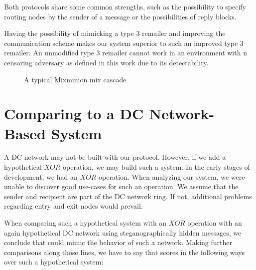 Both protocols share some common strengths, such as the possibility to specify routing nodes by the sender of a message or the possibilities of reply blocks. 

Having the possibility of mimicking a type 3 remailer and improving the communication scheme makes our system superior to such an improved type 3 remailer. An unmodified type 3 remailer cannot work in an environment with n censoring adversary as defined in this work due to its detectability. 

\begin{figure}[ht]\centering
	
	\caption{A typical Mixminion mix cascade}
	\label{fig:mmCommPattern}
\end{figure}

\section{Comparing \MessageVortex{} to a DC Network-Based System}
A DC network may not be built with our \MessageVortex{} protocol. However, if we add a hypothetical $XOR$ operation, we may build such a system. In the early stages of development, we had an $XOR$ operation. When analyzing our system, we were unable to discover good use-cases for such an operation. We assume that the sender and recipient are part of the DC network ring. If not, additional problems regarding entry and exit nodes would prevail. 

When comparing such a hypothetical \MessageVortex{} system with an $XOR$ operation with an again hypothetical DC network using steganographically hidden messages, we conclude that \MessageVortex{} could mimic the behavior of such a network. Making further comparisons along those lines, we have to say that \MessageVortex{} scores in the following ways over such a hypothetical system:

